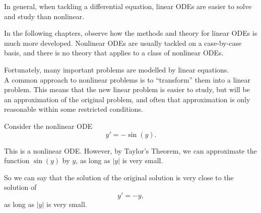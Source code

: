 In general, when tackling a differential equation, linear ODEs are easier to solve and study than nonlinear. 

In the following chapters, observe how the methods and theory for linear ODEs is much more developed. Nonlinear ODEs are usually tackled on a case-by-case basis, and there is no theory that applies to a class of nonlinear ODEs.

Fortunately, many important problems are modelled by linear equations. \\

A common approach to nonlinear problems is to ``transform'' them into a linear problem. This means that the new linear problem is easier to study, but will be an approximation of the original problem, and often that approximation is only reasonable within some restricted conditions.

\begin{example}
Consider the nonlinear ODE
$$y' = -\sin(y).$$

This is a nonlinear ODE. However, by Taylor's Theorem, we can approximate the function $\sin(y)$ by $y$, as long as $|y|$ is very small.

So we can say that the solution of the original solution is very close to the solution of
$$ y' = -y,$$
as long as $|y|$ is very small.
\end{example}





